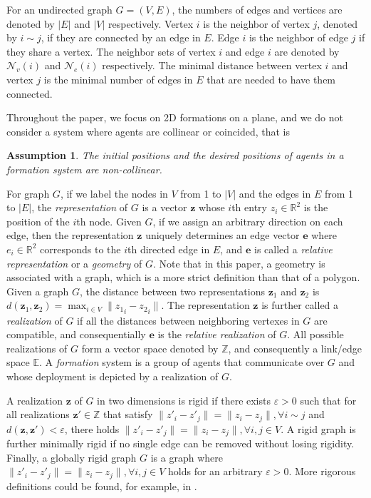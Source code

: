 \documentclass[times]{rncauth}
\newtheorem{assum}{Assumption}[section]
\begin{document}
  For an undirected graph $G=(V,E)$, the numbers of edges and vertices are
  denoted by $|E|$ and $|V|$ respectively.
Vertex $i$ is the neighbor of vertex $j$, denoted by $i\sim j$, if
they are connected by an edge in $E$. Edge $i$ is the neighbor of
edge $j$ if they share a vertex. The neighbor sets of vertex $i$ and
edge $i$ are denoted by $\mathcal{N}_v(i)$ and $\mathcal{N}_e(i)$
respectively. The minimal distance between vertex $i$ and vertex $j$
is the minimal number of  edges in $E$ that are needed to have them
connected.


Throughout the paper, we focus on 2D formations on a plane, and we
do not consider a system where agents are collinear or coincided,
that is
\begin{assum}\label{assumption_generic}
The initial positions and the desired positions of agents in a
formation system are non-collinear.
\end{assum}


For graph $G$, if we label the nodes in $V$ from 1 to $|V|$ and the
edges in $E$ from 1 to $|E|$, the \emph{representation} of $G$ is a
vector $\mathbf{z}$ whose $i$th entry $z_i\in \mathbb{R}^2$ is the
position of the $i$th node. Given $G$, if we assign an arbitrary
direction on each edge, then the  representation $\mathbf{z}$
uniquely determines an edge vector $\mathbf{e}$ where $e_i\in
\mathbb{R}^2$ corresponds to the $i$th directed edge in $E$, and
$\mathbf{e}$ is called a \emph{relative representation} or a
\emph{geometry} of $G$. Note that in this paper, a geometry is
associated with a graph, which is a more strict definition than that
of a polygon. Given a graph $G$, the distance between two
representations $\mathbf{z}_1$ and $\mathbf{z}_2$ is
$d(\mathbf{z}_1,\mathbf{z}_2)=\max_{i\in V}\|{z_1}_i-{z_2}_i\|$. The
representation $\mathbf{z}$ is further called a \emph{realization}
of $G$ if all the distances between neighboring vertexes in $G$ are compatible, and consequentially $\mathbf{e}$ is the \emph{relative
realization} of $G$.
 All possible realizations of $G$ form a vector space denoted by
$\mathbb{Z}$, and consequently a link/edge space $\mathbb{E}$.  A
\emph{formation} system is a group of agents that communicate over
$G$ and whose deployment is depicted by a realization of $G$.

A realization $\mathbf{z}$ of $G$ in two dimensions is rigid if
there exists $\varepsilon>0$ such that for all realizations
$\mathbf{z}'\in\mathbb{Z}$ that satisfy $\|z'_i-z'_j\|=\|z_i-z_j\|,
\forall i\sim j$ and $d(\mathbf{z},\mathbf{z}')<\varepsilon$, there
holds $\|z'_i-z'_j\|=\|z_i-z_j\|,\forall i,j\in V$. A rigid graph is
further minimally rigid if no single edge can be removed without
losing rigidity. Finally, a globally rigid graph $G$ is a graph
where $\|z'_i-z'_j\|=\|z_i-z_j\|,\forall i,j\in V$ holds for an
arbitrary $\varepsilon>0$. More rigorous definitions could be found,
for example, in
\cite{Yu09minimalPersistent,Anderson08rigidMagazine}.
\end{document}
